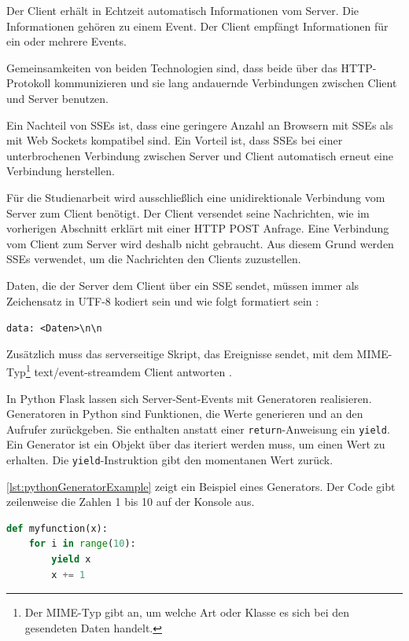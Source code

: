 \documentclass[a4paper,titlepage,halfparskip,12pt]{scrreprt}
\newcommand*{\escape}[1]{\texttt{\textbackslash#1}}
\begin{document}
\begin{onehalfspacing}
Der Client erhält in Echtzeit automatisch Informationen vom Server. Die Informationen gehören zu einem Event. Der Client empfängt Informationen für ein oder mehrere Events.\cite{sseMorzilla, sseVSwebsockets}

Gemeinsamkeiten von beiden Technologien sind, dass beide über das \acs{HTTP}-Protokoll kommunizieren und sie lang andauernde Verbindungen zwischen Client und Server benutzen.

Ein Nachteil von \acs{SSE}s ist, dass eine geringere Anzahl an Browsern mit \acs{SSE}s als mit Web Sockets kompatibel sind. Ein Vorteil ist, dass \acs{SSE}s bei einer unterbrochenen Verbindung zwischen Server und Client automatisch erneut eine Verbindung herstellen.\cite{sseMorzilla}

Für die Studienarbeit wird ausschließlich eine unidirektionale Verbindung vom Server zum Client benötigt. Der Client versendet seine Nachrichten, wie im vorherigen Abschnitt erklärt mit einer \acs{HTTP} POST Anfrage. Eine Verbindung vom Client zum Server wird deshalb nicht gebraucht. Aus diesem Grund werden \acs{SSE}s verwendet, um die Nachrichten den Clients zuzustellen.

Daten, die der Server dem Client über ein \acs{SSE} sendet, müssen immer als Zeichensatz in UTF-8 kodiert sein und wie folgt formatiert sein \cite{sseMorzilla}:

\texttt{data: <Daten>\escape{n}\escape{n}}

Zusätzlich muss das serverseitige Skript, das Ereignisse sendet, mit dem \acs{MIME}-Typ\footnote{ Der MIME-Typ gibt an, um welche Art oder Klasse es sich bei den gesendeten Daten handelt.\cite{mimeTypDescription}} \glqq text/event-stream\grqq dem Client antworten \cite{sseMorzilla}.

In Python Flask lassen sich Server-Sent-Events mit Generatoren realisieren. Generatoren in Python sind Funktionen, die Werte generieren und an den Aufrufer zurückgeben. Sie enthalten anstatt einer \texttt{return}-Anweisung ein \texttt{yield}. Ein Generator ist ein Objekt über das iteriert werden muss, um einen Wert zu erhalten. Die \texttt{yield}-Instruktion gibt den momentanen Wert zurück.

\autoref{lst:pythonGeneratorExample} zeigt ein Beispiel eines Generators. Der Code gibt zeilenweise die Zahlen 1 bis 10 auf der Konsole aus.

\begin{lstlisting}[language=python, caption={Beispiel: Code für ein Generator Objekt in Python}, label={lst:pythonGeneratorExample}]
def myfunction(x):
    for i in range(10):
        yield x
        x += 1


\end{lstlisting}
\end{onehalfspacing}
\end{document}
